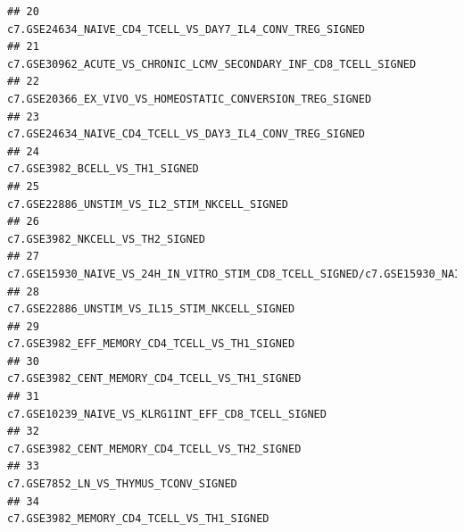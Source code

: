 \documentclass{article}\usepackage[]{graphicx}\usepackage[]{color}
\makeatletter
\newenvironment{kframe}{%
 \def\at@end@of@kframe{}%
 \ifinner\ifhmode%
  \def\at@end@of@kframe{\end{minipage}}%
  \begin{minipage}{\columnwidth}%
 \fi\fi%
 \def\FrameCommand##1{\hskip\@totalleftmargin \hskip-\fboxsep
 \colorbox{shadecolor}{##1}\hskip-\fboxsep
     \hskip-\linewidth \hskip-\@totalleftmargin \hskip\columnwidth}%
 \MakeFramed {\advance\hsize-\width
   \@totalleftmargin\z@ \linewidth\hsize
   \@setminipage}}%
 {\par\unskip\endMakeFramed%
 \at@end@of@kframe}
\newenvironment{knitrout}{}{} %
\makeatother
\begin{document}
\begin{knitrout}
\begin{kframe}
\begin{verbatim}
## 20                                                                                                                           c7.GSE24634_NAIVE_CD4_TCELL_VS_DAY7_IL4_CONV_TREG_SIGNED
## 21                                                                                                                   c7.GSE30962_ACUTE_VS_CHRONIC_LCMV_SECONDARY_INF_CD8_TCELL_SIGNED
## 22                                                                                                                          c7.GSE20366_EX_VIVO_VS_HOMEOSTATIC_CONVERSION_TREG_SIGNED
## 23                                                                                                                           c7.GSE24634_NAIVE_CD4_TCELL_VS_DAY3_IL4_CONV_TREG_SIGNED
## 24                                                                                                                                                     c7.GSE3982_BCELL_VS_TH1_SIGNED
## 25                                                                                                                                       c7.GSE22886_UNSTIM_VS_IL2_STIM_NKCELL_SIGNED
## 26                                                                                                                                                    c7.GSE3982_NKCELL_VS_TH2_SIGNED
## 27 c7.GSE15930_NAIVE_VS_24H_IN_VITRO_STIM_CD8_TCELL_SIGNED/c7.GSE15930_NAIVE_VS_24H_IN_VITRO_STIM_IL12_CD8_TCELL_SIGNED/c7.GSE15930_NAIVE_VS_24H_IN_VITRO_STIM_INFAB_CD8_TCELL_SIGNED
## 28                                                                                                                                      c7.GSE22886_UNSTIM_VS_IL15_STIM_NKCELL_SIGNED
## 29                                                                                                                                      c7.GSE3982_EFF_MEMORY_CD4_TCELL_VS_TH1_SIGNED
## 30                                                                                                                                     c7.GSE3982_CENT_MEMORY_CD4_TCELL_VS_TH1_SIGNED
## 31                                                                                                                                 c7.GSE10239_NAIVE_VS_KLRG1INT_EFF_CD8_TCELL_SIGNED
## 32                                                                                                                                     c7.GSE3982_CENT_MEMORY_CD4_TCELL_VS_TH2_SIGNED
## 33                                                                                                                                               c7.GSE7852_LN_VS_THYMUS_TCONV_SIGNED
## 34                                                                                                                                          c7.GSE3982_MEMORY_CD4_TCELL_VS_TH1_SIGNED

\end{verbatim}
\end{kframe}
\end{knitrout}
\end{document}
